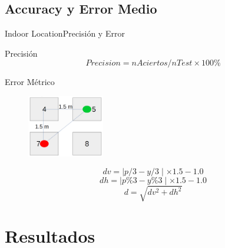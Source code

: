 \documentclass[10pt]{beamer}
\begin{document}
\subsection{Accuracy y Error Medio}
\begin{frame}{Indoor Location}{Precisión y Error}
\begin{block}{Precisión}
$$Precision = nAciertos/nTest\times 100\%$$
\end{block}
\begin{block}{Error Métrico}
\begin{figure}
    \centering
    \includegraphics[width=0.3\textwidth]{AAUgraphics/espacio}
\end{figure}
$$dv = \mid p/3 - y/3\mid\times 1.5-1.0$$
$$dh= \mid p\%3 - y\%3\mid\times 1.5-1.0$$
$$d = \sqrt{dv^2 + dh^2}$$
\end{block}
\end{frame}

\section{Resultados}
\end{document}
